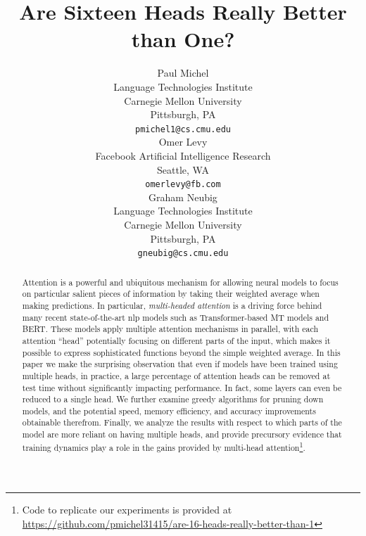 \documentclass{article}
\title{Are Sixteen Heads Really Better than One?}
\author{Paul Michel \\
  Language Technologies Institute \\
  Carnegie Mellon University \\
  Pittsburgh, PA \\
  \texttt{pmichel1@cs.cmu.edu} \\\And
  Omer Levy\\
  Facebook Artificial Intelligence Research \\
  Seattle, WA \\
  \texttt{omerlevy@fb.com} \\\And
  Graham Neubig\\
  Language Technologies Institute \\
  Carnegie Mellon University \\
  Pittsburgh, PA \\
  \texttt{gneubig@cs.cmu.edu} \\}
\date{}
\newcommand{\paul}[1]{\ifcomments\textcolor{blue}{\bf\small [#1 --PM]}\else\fi}
\newcommand{\gn}[1]{\ifcomments\textcolor{red}{\bf\small [#1 --GN]}\else\fi}
\newcommand{\omer}[1]{\ifcomments\textcolor{green}{\bf\small [#1 --OL]}\else\fi}
\newif\ifcomments
\begin{document}
\maketitle
\begin{abstract}
Attention is a powerful and ubiquitous mechanism for allowing neural models to focus on particular salient pieces of information by taking their weighted average when making predictions.
In particular, \emph{multi-headed attention} is a driving force behind many recent state-of-the-art \ac{nlp} models such as Transformer-based MT models and BERT.
These models apply multiple attention mechanisms in parallel, with each attention ``head'' potentially focusing on different parts of the input,
which makes it possible to express sophisticated functions beyond the simple weighted average.
In this paper we make the surprising observation that even if models have been trained using multiple heads, in practice, a large percentage of attention heads can be removed at test time without significantly impacting performance.
In fact, some layers can even be reduced to a single head.
We further examine greedy algorithms for pruning down models, and the potential speed, memory efficiency, and accuracy improvements obtainable therefrom.
Finally, we analyze the results with respect to which parts of the model are more reliant on having multiple heads, and provide precursory evidence that training dynamics play a role in the gains provided by multi-head attention\footnote{Code to replicate our experiments is provided at \url{https://github.com/pmichel31415/are-16-heads-really-better-than-1}}.

\end{abstract}
\end{document}
